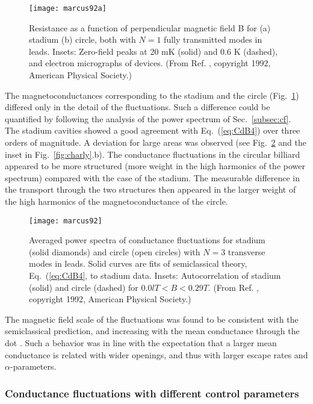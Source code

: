 \documentclass[a4paper,10pt]{article}
\newcommand{\nin}{\noindent}
\begin{document}
\begin{figure}
\setlength{\unitlength}{1mm}
\centerline{\texttt{[image: marcus92a]}}
\caption{ 
Resistance as a function of perpendicular magnetic field B for (a) stadium (b) circle, both with $N=1$ fully transmitted modes in leads. Insets: Zero-field peaks at 20 mK (solid) and 0.6 K (dashed), and electron micrographs of devices.
(From Ref. \protect\cite{Mar92}, copyright 1992, American Physical Society.)}
\label{fig:marcus92a}
\end{figure}

\nin The magnetoconductances corresponding to the stadium and the circle (Fig.~\ref{fig:marcus92a}) differed only in the detail of the fluctuations. Such a difference could be quantified by following the analysis of the power spectrum of Sec.~\ref{subsec:cf}. The stadium cavities showed a good agreement with Eq.~(\ref{eq:CdB4}) over three orders of magnitude. A deviation for large areas was observed (see Fig.~\ref{fig:marcus92} and the inset in Fig.~\ref{fig:charly}.b). The conductance fluctuations in the circular billiard appeared to be more structured (more weight in the  high harmonics of the power spectrum) compared with the case of the stadium. The measurable difference in the transport through the two structures then appeared in the larger weight of the high harmonics of the magnetoconductance of the circle. 

\begin{figure}
\setlength{\unitlength}{1mm}
\centerline{\texttt{[image: marcus92]}}
\caption{ 
Averaged power spectra of conductance fluctuations for stadium (solid diamonds) and circle (open circles) with $N=3$ transverse modes in leads. Solid curves are fits of semiclassical theory, Eq.~(\ref{eq:CdB4}, to stadium data. Insets: Autocorrelation of stadium (solid) and circle (dashed) for $0.0l T < B < 0.29 T$.
(From Ref. \protect\cite{Mar92}, copyright 1992, American Physical Society.)}
\label{fig:marcus92}
\end{figure}

\nin The magnetic field scale of the fluctuations was found to be consistent with the semiclassical prediction, and increasing with the mean
conductance through the dot \cite{marcusgroup1}. Such a behavior was in line with the expectation that a larger mean conductance is related with wider openings, and thus with larger escape rates and $\alpha$-parameters. 

\subsubsection{Conductance fluctuations with different control parameters}
\label{subsec:cfdcp}
\end{document}
